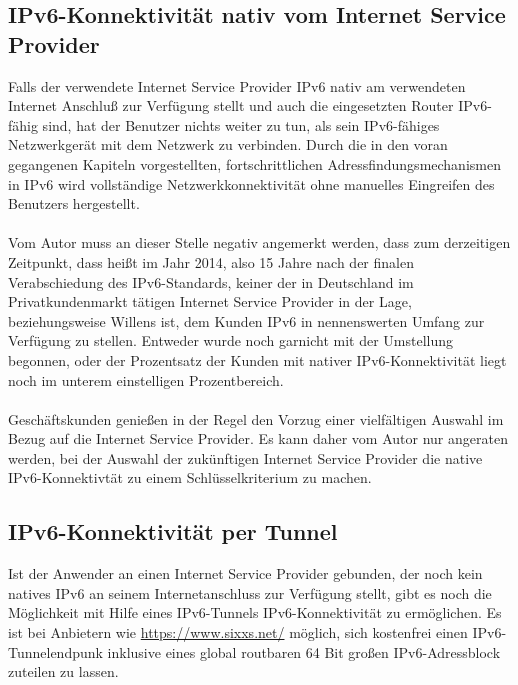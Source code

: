 \documentclass[a4paper,12pt]{scrartcl}
\begin{document}
\subsection{IPv6-Konnektivit\"at nativ vom Internet Service Provider}
Falls der verwendete Internet Service Provider IPv6 nativ am verwendeten Internet Anschlu{\ss} zur Verf\"ugung stellt und auch die eingesetzten Router IPv6-f\"ahig sind, hat der Benutzer nichts weiter zu tun, als sein IPv6-f\"ahiges Netzwerkger\"at mit dem Netzwerk zu verbinden. Durch die in den voran gegangenen Kapiteln vorgestellten, fortschrittlichen Adressfindungsmechanismen in IPv6 wird vollst\"andige Netzwerkkonnektivit\"at ohne manuelles Eingreifen des Benutzers hergestellt.\\
\\
Vom Autor muss an dieser Stelle negativ angemerkt werden, dass zum derzeitigen Zeitpunkt, dass heißt im Jahr 2014, also 15 Jahre nach der finalen Verabschiedung des IPv6-Standards,  keiner der in Deutschland im Privatkundenmarkt t\"atigen Internet Service Provider in der Lage, beziehungsweise Willens ist, dem Kunden IPv6 in nennenswerten Umfang zur Verf\"ugung zu stellen. Entweder wurde noch garnicht mit der Umstellung begonnen, oder der Prozentsatz der Kunden mit nativer IPv6-Konnektivit\"at liegt noch im unterem einstelligen Prozentbereich.\\
\\
Gesch\"aftskunden genie{\ss}en in der Regel den Vorzug einer vielf\"altigen Auswahl im Bezug auf die Internet Service Provider. Es kann daher vom Autor nur angeraten werden, bei der Auswahl der zuk\"unftigen Internet Service Provider die native IPv6-Konnektivt\"at zu einem Schl\"usselkriterium zu machen.

\subsection{IPv6-Konnektivit\"at per Tunnel}
Ist der Anwender an einen Internet Service Provider gebunden, der noch kein natives IPv6 an seinem Internetanschluss zur Verf\"ugung stellt, gibt es noch die M\"oglichkeit mit Hilfe eines IPv6-Tunnels IPv6-Konnektivit\"at zu erm\"oglichen. Es ist bei Anbietern wie \url{https://www.sixxs.net/} m\"oglich, sich kostenfrei einen IPv6-Tunnelendpunk inklusive eines global routbaren 64 Bit gro{\ss}en IPv6-Adressblock zuteilen zu lassen. 
\end{document}
